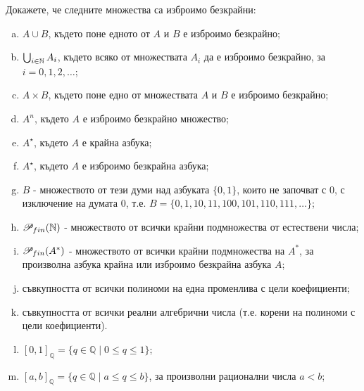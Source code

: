 \begin{problem}
  Докажете, че следните множества са изброимо безкрайни:
  \begin{enumerate}[a)]
  \item 
    $A \cup B$, където поне едното от $A$ и $B$ е изброимо безкрайно;
  \item
    $\bigcup_{i\in\mathbb{N}} A_i$, където всяко от множествата $A_i$ да е изброимо безкрайно, за $i = 0,1,2,\dots$;
  \item
    $A \times B$, където поне едно от множествата $A$ и $B$ е изброимо безкрайно;
  \item
    $A^n$, където $A$ е изброимо безкрайно множество;
  \item
    $A^\star$, където $A$ е крайна азбука;
  \item
    $A^\star$, където $A$ е изброимо безкрайна азбука;
  \item
    $B$ - множеството от тези думи над азбуката $\{0,1\}$, които не започват с $0$, с изключение на 
    думата $0$, т.е. $B = \{0, 1, 10, 11, 100, 101, 110, 111, \dots\}$;
  \item
    $\mathscr{P}_{fin}(\mathbb{N})$ - множеството от всички крайни подмножества от естествени числа;
  \item
    $\mathscr{P}_{fin}(A^*)$ - множеството от всички крайни подмножества на $A^*$, за произволна азбука 
    крайна или изброимо безкрайна азбука $A$;
  \item
    съвкупността от всички полиноми на една променлива с цели коефициенти;
  \item
    съвкупността от всички реални алгебрични числа (т.е. корени на полиноми с цели коефициенти).
  \item
    $[0,1]_{\mathbb{Q}} = \{q \in \mathbb{Q} \mid 0 \leq q \leq 1\}$;
  \item
    $[a,b]_{\mathbb{Q}} = \{q \in \mathbb{Q} \mid a \leq q \leq b\}$, за произволни рационални числа $a < b$;
  \end{enumerate}
\end{problem}
